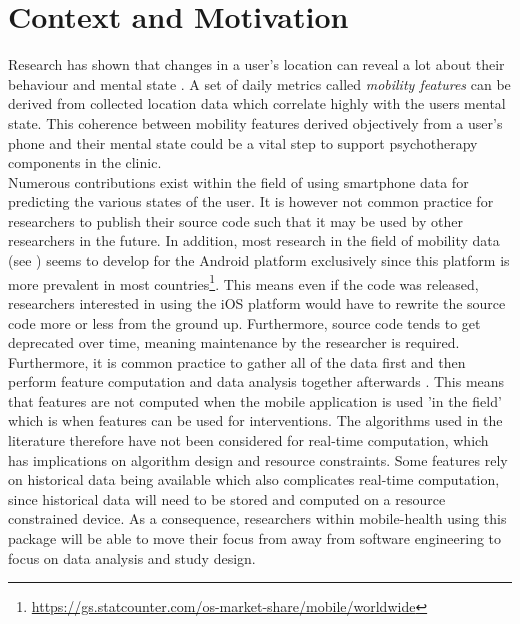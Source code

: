 \section{Context and Motivation}



Research has shown that changes in a user's location can reveal a lot about their behaviour and mental state \cite{Saeb2015, Canzian2015, palmius2017, }. A set of daily metrics called \textit{mobility features} can be derived from collected location data which correlate highly with the users mental state. This coherence between mobility features derived objectively from a user's phone and their mental state could be a vital step to support psychotherapy components in the clinic.\\

Numerous contributions exist within the field of using smartphone data for predicting the various states of the user. It is however not common practice for researchers to publish their source code such that it may be used by other researchers in the future. In addition, most research in the field of mobility data (see \cite{Saeb2015, saeb2016, Canzian2015, extraction-of-behavioural-features}) seems to develop for the Android platform exclusively since this platform is more prevalent in most countries\footnote{\url{https://gs.statcounter.com/os-market-share/mobile/worldwide}}. This means even if the code was released, researchers interested in using the iOS platform would have to rewrite the source code more or less from the ground up. Furthermore, source code tends to get deprecated over time, meaning maintenance by the researcher is required. \\

Furthermore, it is common practice to gather all of the data first and then perform feature computation and data analysis together afterwards \cite{Saeb2015, saeb2016, sparse-location-2014, extraction-of-behavioural-features}. This means that features are not computed when the mobile application is used 'in the field' which is when features can be used for interventions. The algorithms used in the literature therefore have not been considered for real-time computation, which has implications on algorithm design and resource constraints. Some features rely on historical data being available which also complicates real-time computation, since historical data will need to be stored and computed on a resource constrained device. As a consequence, researchers within mobile-health using this package will be able to move their focus from away from software engineering to focus on data analysis and study design.\\

